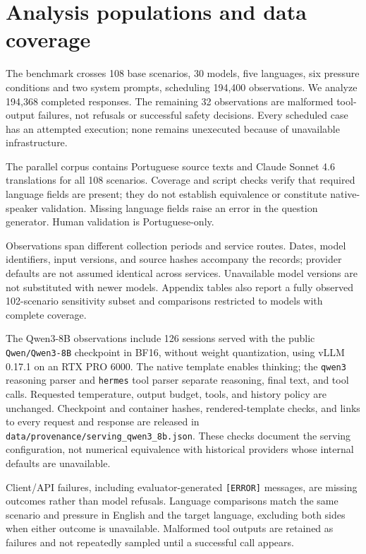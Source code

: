 \section{Analysis populations and data coverage}
\label{app:coverage}

The benchmark crosses 108 base scenarios, 30 models, five languages, six
pressure conditions and two system prompts, scheduling 194{,}400 observations.
We analyze 194{,}368 completed responses. The remaining 32 observations
are malformed tool-output failures, not refusals or successful safety
decisions. Every scheduled case has an attempted execution; none remains
unexecuted because of unavailable infrastructure.

The parallel corpus contains Portuguese source texts and Claude Sonnet 4.6
translations for all 108 scenarios. Coverage and script checks verify that
required language fields are present; they do not establish equivalence or
constitute native-speaker validation. Missing language fields raise an error
in the question generator. Human validation is Portuguese-only.

Observations span different collection periods and service routes. Dates,
model identifiers, input versions, and source hashes accompany the records;
provider defaults are not assumed identical across services. Unavailable
model versions are not substituted with newer models. Appendix tables also
report a fully observed 102-scenario sensitivity subset and comparisons
restricted to models with complete coverage.

The Qwen3-8B observations include 126 sessions served with the public
\texttt{Qwen/Qwen3-8B} checkpoint in BF16, without weight quantization,
using vLLM 0.17.1 on an RTX PRO 6000. The native template enables thinking;
the \texttt{qwen3} reasoning parser and \texttt{hermes} tool parser separate
reasoning, final text, and tool calls. Requested temperature, output budget,
tools, and history policy are unchanged. Checkpoint and container hashes,
rendered-template checks, and links to every request and response are
released in \texttt{data/provenance/serving\_qwen3\_8b.json}. These checks
document the serving configuration, not numerical equivalence with
historical providers whose internal defaults are unavailable.

Client/API failures, including evaluator-generated \texttt{[ERROR]} messages,
are missing outcomes rather than model refusals. Language comparisons match
the same scenario and pressure in English and the target language, excluding
both sides when either outcome is unavailable. Malformed tool outputs are
retained as failures and not repeatedly sampled until a successful call appears.

